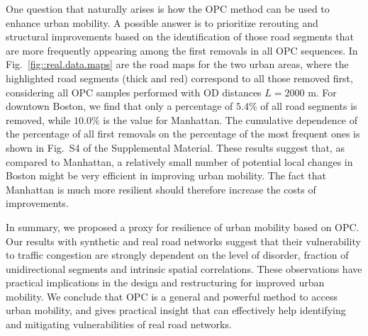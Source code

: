 \documentclass[aps,prl,twocolumn,showpacs,
superscriptaddress,floatfix, 10pt]{revtex4-1}
\begin{document}
One question that naturally arises is how the OPC method can be used to enhance
urban mobility. A possible answer is to prioritize rerouting and structural
improvements based on the identification of those road segments that are more
frequently appearing among the first removals in all OPC sequences. In
Fig.~\ref{fig::real.data.maps} are the road maps for the two urban areas, where
the highlighted road segments (thick and red) correspond to all those removed
first, considering all OPC samples performed with OD distances $L=2000$ m. For
downtown Boston, we find that only a percentage of $5.4\%$ of all road segments
is removed, while $10.0\%$ is the value for Manhattan. The cumulative dependence
of the percentage of all first removals on the percentage of the most frequent
ones is shown in Fig.~S4 of the Supplemental Material. These results suggest
that, as compared to Manhattan, a relatively small number of potential local
changes in Boston might be very efficient in improving urban mobility. The fact
that Manhattan is much more resilient should therefore increase the costs of
improvements.

In summary, we proposed a proxy for resilience of urban mobility based on OPC.
Our results with synthetic and real road networks suggest that their
vulnerability to traffic congestion are strongly dependent on the level of
disorder, fraction of unidirectional segments and intrinsic spatial
correlations. These observations have practical implications in the design and
restructuring for improved urban mobility. We conclude that OPC is a general and
powerful method to access urban mobility, and gives practical insight that can
effectively help identifying and mitigating vulnerabilities of real road
networks.
\end{document}

